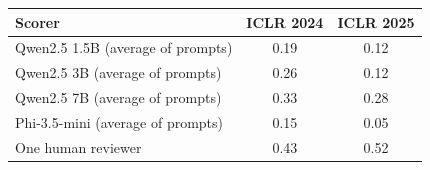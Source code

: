 \begin{tabular}{lcc}
\toprule
\textbf{Scorer} & \textbf{ICLR 2024} & \textbf{ICLR 2025} \\
\midrule
Qwen2.5 1.5B (average of prompts) & 0.19 & 0.12 \\
Qwen2.5 3B (average of prompts) & 0.26 & 0.12 \\
Qwen2.5 7B (average of prompts) & 0.33 & 0.28 \\
Phi-3.5-mini (average of prompts) & 0.15 & 0.05 \\
\midrule
One human reviewer & 0.43 & 0.52 \\
\bottomrule
\end{tabular}
